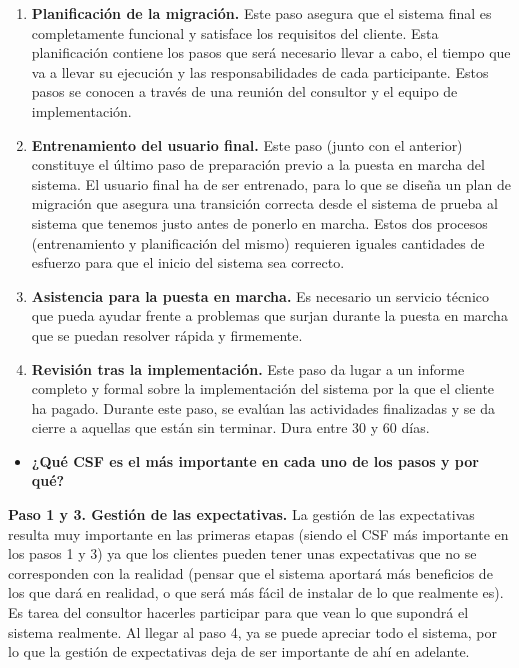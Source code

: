 \documentclass[11pt,a4paper]{article}
\begin{document}
\begin{itemize}
\begin{enumerate}
\item \textbf{Planificación de la migración.} 
Este paso asegura que el sistema final es completamente funcional y satisface los requisitos del cliente. Esta planificación contiene los pasos que será necesario llevar a cabo, el tiempo que va a llevar su ejecución y las responsabilidades de cada participante. Estos pasos se conocen a través de una reunión del consultor y el equipo de implementación. 

\item \textbf{Entrenamiento del usuario final.} 
Este paso (junto con el anterior) constituye el último paso de preparación previo a la puesta en marcha del sistema. El usuario final ha de ser entrenado, para lo que se diseña un plan de migración que asegura una transición correcta desde el sistema de prueba al sistema que tenemos justo antes de ponerlo en marcha. Estos dos procesos (entrenamiento y planificación del mismo) requieren iguales cantidades de esfuerzo para que el inicio del sistema sea correcto. 

\item \textbf{Asistencia para la puesta en marcha.} 
Es necesario un servicio técnico que pueda ayudar frente a problemas que surjan durante la puesta en marcha que se puedan resolver rápida y firmemente.

\item \textbf{Revisión tras la implementación.}
Este paso da lugar a un informe completo y formal sobre la implementación del sistema por la que el cliente ha pagado. Durante este paso, se evalúan las actividades finalizadas y se da cierre a aquellas que están sin terminar. Dura entre 30 y 60 días.
\end{enumerate}
\end{itemize}

\begin{itemize}
\item \textbf{¿Qué CSF es el más importante en cada uno de los pasos y por qué?}
\end{itemize}
\textbf{Paso 1 y 3. Gestión de las expectativas.} La gestión de las expectativas resulta muy importante en las primeras etapas (siendo el CSF más importante en los pasos 1 y 3) ya que los clientes pueden tener unas expectativas que no se corresponden con la realidad (pensar que el sistema aportará más beneficios de los que dará en realidad, o que será más fácil de instalar de lo que realmente es). Es tarea del consultor hacerles participar para que vean lo que supondrá el sistema realmente. Al llegar al paso 4, ya se puede apreciar todo el sistema, por lo que la gestión de expectativas deja de ser importante de ahí en adelante. 
\end{document}
